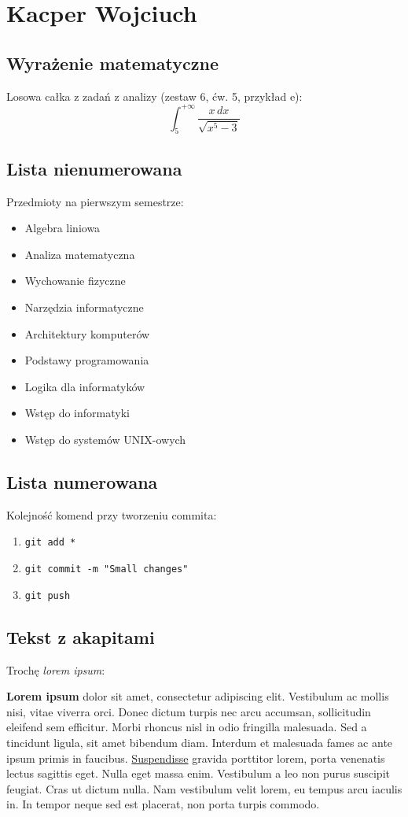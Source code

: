 \section{Kacper Wojciuch}
\label{sec:kw}

\subsection{Wyrażenie matematyczne}
Losowa całka z zadań z analizy (zestaw 6, ćw. 5, przykład e):
\[\int_{5}^{+\infty} \frac{x \,dx}{\sqrt{x^5 - 3}}\]

\subsection{Lista nienumerowana}
Przedmioty na pierwszym semestrze:
\begin{itemize}
    \item Algebra liniowa
    \item Analiza matematyczna
    \item Wychowanie fizyczne
    \item Narzędzia informatyczne
    \item Architektury komputerów
    \item Podstawy programowania
    \item Logika dla informatyków
    \item Wstęp do informatyki
    \item Wstęp do systemów UNIX-owych
\end{itemize}

\subsection{Lista numerowana}
Kolejność komend przy tworzeniu commita:
\begin{enumerate}
    \item \verb|git add *|
    \item \verb|git commit -m "Small changes"|
    \item \verb|git push|
\end{enumerate}

\subsection{Tekst z akapitami}
Trochę \textit{lorem ipsum}:

\textbf{Lorem ipsum} dolor sit amet, consectetur adipiscing elit. Vestibulum ac mollis nisi, vitae viverra orci. Donec dictum turpis nec arcu accumsan, sollicitudin eleifend sem efficitur. Morbi rhoncus nisl in odio fringilla malesuada. Sed a tincidunt ligula, sit amet bibendum diam. Interdum et malesuada fames ac ante ipsum primis in faucibus. \underline{Suspendisse} gravida porttitor lorem, porta venenatis lectus sagittis eget. Nulla eget massa enim. Vestibulum a leo non purus suscipit feugiat. Cras ut dictum nulla. Nam vestibulum velit lorem, eu tempus arcu iaculis in. In tempor neque sed est placerat, non porta turpis commodo.


